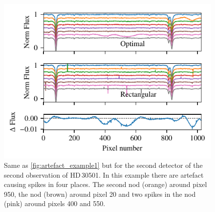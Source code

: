   \begin{figure}
    \centering
    \includegraphics[width=0.7\linewidth]{figures/appendix/bp_plots/extraction_comparision_HD30501-2b_chip_2}
    \caption{Same as \cref{fig:artefact_example1} but for the second detector of the second observation of {HD\,30501}.
In this example there are artefact causing spikes in four places.
The second nod (orange) around pixel 950, the  nod (brown) around pixel 20 and two spikes in the  nod (pink) around pixels 400 and 550.}
    \label{fig:artefact_example7}
\end{figure}
